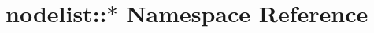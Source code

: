 \hypertarget{namespacenodelist_1_1_5}{
\section{nodelist::$\ast$ Namespace Reference}
\label{namespacenodelist_1_1_5}
}


